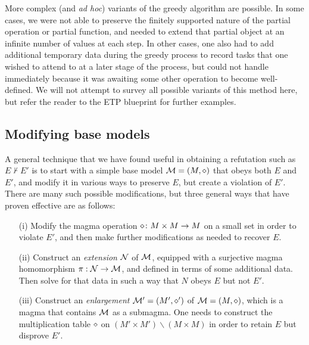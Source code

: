 More complex (and \emph{ad hoc}) variants of the greedy algorithm are possible.  In some cases, we were not able to preserve the finitely supported nature of the partial operation or partial function, and needed to extend that partial object at an infinite number of values at each step.  In other cases, one also had to add additional temporary data during the greedy process to record tasks that one wished to attend to at a later stage of the process, but could not handle immediately because it was awaiting some other operation to become well-defined.  We will not attempt to survey all possible variants of this method here, but refer the reader to the ETP blueprint for further examples.

\subsection{Modifying base models}\label{modify-base}

A general technique that we have found useful in obtaining a refutation such as $E \nvdash E'$ is to start with a simple base model ${\mathcal{M}} = (M,\diamond)$ that obeys both $E$ and $E'$, and modify it in various ways to preserve $E$, but create a violation of $E'$.  There are many such possible modifications, but three general ways that have proven effective are as follows:

\begin{itemize}
  \item[(i)]  Modify the magma operation $\diamond \colon M \times M \to M$ on a small set in order to violate $E'$, and then make further modifications as needed to recover $E$.
  \item[(ii)]  Construct an \emph{extension} ${\mathcal{N}}$ of ${\mathcal{M}}$, equipped with a surjective magma homomorphism $\pi: {\mathcal{N}} \to {\mathcal{M}}$, and defined in terms of some additional data.  Then solve for that data in such a way that $N$ obeys $E$ but not $E'$.
  \item[(iii)]  Construct an \emph{enlargement} ${\mathcal{M}}' = (M',\diamond')$ of ${\mathcal{M}} = (M,\diamond)$, which is a magma that contains ${\mathcal{M}}$ as a submagma.  One needs to construct the multiplication table $\diamond$ on $(M' \times M') \backslash (M \times M)$ in order to retain $E$ but disprove $E'$.
\end{itemize}

